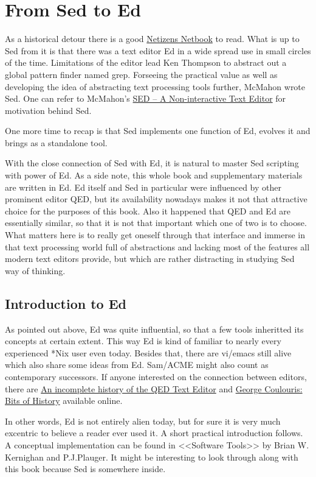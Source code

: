 \chapter{From Sed to Ed}
As a historical detour there is a good \href{http://www.columbia.edu/~hauben/book/}{Netizens Netbook} to read.
What is up to Sed from it is that there was a text editor Ed
in a wide spread use in small circles of the time.
Limitations of the editor lead Ken Thompson to abstract out
a global pattern finder named grep.
Forseeing the practical value as well as developing the
idea of abstracting text processing tools further,
McMahon wrote Sed.
One can refer to McMahon's
\href{https://people.eecs.berkeley.edu/~clancy/sp.unix.stuff/sed.pdf}
{SED -- A Non-interactive Text Editor} for motivation behind Sed.

One more time to recap is that Sed implements one function
of Ed, evolves it and brings as a standalone tool.

With the close connection of Sed with Ed, it is natural
to master Sed scripting with power of Ed. As a side note,
this whole book and supplementary materials are written in Ed.
Ed itself and Sed in particular were influenced by other
prominent editor QED, but its availability nowadays makes it
not that attractive choice for the purposes of this book.
Also it happened that QED and Ed are essentially similar, so
that it is not that important which one of two is to choose.
What matters here is to really get oneself through that
interface and immerse in that text processing world full of
abstractions and lacking most of the features all modern
text editors provide, but which are rather distracting in studying
Sed way of thinking.

\section{Introduction to Ed}
As pointed out above, Ed was quite influential, so that a few tools
inheritted its concepts at certain extent. This way Ed is kind of
familiar to nearly every experienced *Nix user even today.
Besides that, there are vi/emacs still alive which also share
some ideas from Ed.
Sam/ACME might also count as contemporary successors.
If anyone interested on the connection between editors,
there are \href{https://www.bell-labs.com/usr/dmr/www/qed.html}
{An incomplete history of the QED Text Editor}
and \href{http://eecs.qmul.ac.uk/~gc/history/}{George Coulouris: Bits of History}
available online.

In other words, Ed is not entirely alien today,
but for sure it is very much excentric to believe a reader ever used it.
A short practical introduction follows.
A conceptual implementation can be found in <<Software Tools>> by
Brian W. Kernighan and P.J.Plauger.
It might be interesting to look through along with this book
because Sed is somewhere inside.
